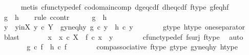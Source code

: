 \begin{isabellebody}
\ \ \ \ \isamarkupfalse%
\ {\isacharparenleft}{\kern0pt}metis\ cfunc{\isacharunderscore}{\kern0pt}type{\isacharunderscore}{\kern0pt}def\ codomain{\isacharunderscore}{\kern0pt}comp\ d{\isacharunderscore}{\kern0pt}g{\isacharunderscore}{\kern0pt}eq{\isacharunderscore}{\kern0pt}cd{\isacharunderscore}{\kern0pt}f\ d{\isacharunderscore}{\kern0pt}h{\isacharunderscore}{\kern0pt}eq{\isacharunderscore}{\kern0pt}cd{\isacharunderscore}{\kern0pt}f\ f{\isacharunderscore}{\kern0pt}type\ gf{\isacharunderscore}{\kern0pt}eq{\isacharunderscore}{\kern0pt}hf{\isacharparenright}{\kern0pt}\isanewline
\ \ \isamarkupfalse%
\ {\isachardoublequoteopen}g\ {\isacharequal}{\kern0pt}\ h{\isachardoublequoteclose}\isanewline
\ \ \isamarkupfalse%
\ {\isacharparenleft}{\kern0pt}rule\ ccontr{\isacharparenright}{\kern0pt}\isanewline
\ \ \ \ \isamarkupfalse%
\ {\isachardoublequoteopen}g\ {\isasymnoteq}\ h{\isachardoublequoteclose}\isanewline
\ \ \ \ \isamarkupfalse%
\ \isamarkupfalse%
\ y\ \ y{\isacharunderscore}{\kern0pt}in{\isacharunderscore}{\kern0pt}X{\isacharcolon}{\kern0pt}\ {\isachardoublequoteopen}y\ {\isasymin}\isactrlsub c\ Y{\isachardoublequoteclose}\ \ gy{\isacharunderscore}{\kern0pt}neq{\isacharunderscore}{\kern0pt}hy{\isacharcolon}{\kern0pt}\ {\isachardoublequoteopen}g\ {\isasymcirc}\isactrlsub c\ y\ {\isasymnoteq}\ h\ {\isasymcirc}\isactrlsub c\ y{\isachardoublequoteclose}\isanewline
\ \ \ \ \ \ \isamarkupfalse%
\ g{\isacharunderscore}{\kern0pt}type\ h{\isacharunderscore}{\kern0pt}type\ one{\isacharunderscore}{\kern0pt}separator\ \isamarkupfalse%
\ blast\isanewline
\ \ \ \ \isamarkupfalse%
\ \isamarkupfalse%
\ x\ \ {\isachardoublequoteopen}x\ {\isasymin}\isactrlsub c\ X{\isachardoublequoteclose}\ \ {\isachardoublequoteopen}f\ {\isasymcirc}\isactrlsub c\ x\ {\isacharequal}{\kern0pt}\ y{\isachardoublequoteclose}\isanewline
\ \ \ \ \ \ \isamarkupfalse%
\ cfunc{\isacharunderscore}{\kern0pt}type{\isacharunderscore}{\kern0pt}def\ f{\isacharunderscore}{\kern0pt}surj\ f{\isacharunderscore}{\kern0pt}type\ \isamarkupfalse%
\ auto\isanewline
\ \ \ \ \isamarkupfalse%
\ \isamarkupfalse%
\ {\isachardoublequoteopen}g\ {\isasymcirc}\isactrlsub c\ f\ {\isasymnoteq}\ h\ {\isasymcirc}\isactrlsub c\ f{\isachardoublequoteclose}\isanewline
\ \ \ \ \ \ \isamarkupfalse%
\ comp{\isacharunderscore}{\kern0pt}associative{}\ f{\isacharunderscore}{\kern0pt}type\ g{\isacharunderscore}{\kern0pt}type\ gy{\isacharunderscore}{\kern0pt}neq{\isacharunderscore}{\kern0pt}hy\ h{\isacharunderscore}{\kern0pt}type\ \isamarkupfalse%

\end{isabellebody}
